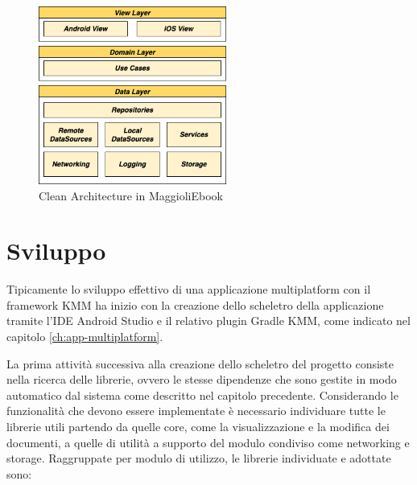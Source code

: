 \begin{figure}[H]
    \centering
    \includegraphics[width=0.55\textwidth]{img/clean-architecture.png}
    \caption{Clean Architecture in MaggioliEbook}
    \label{clean-arch-kmm-fig}
\end{figure}

\section{Sviluppo}
Tipicamente lo sviluppo effettivo di una applicazione multiplatform con il framework KMM ha inizio con la creazione dello scheletro della applicazione tramite l'IDE Android Studio e il relativo plugin Gradle KMM, come indicato nel capitolo \ref{ch:app-multiplatform}.

La prima attività successiva alla creazione dello scheletro del progetto consiste nella ricerca delle librerie, ovvero le stesse dipendenze che sono gestite in modo automatico dal sistema come descritto nel capitolo precedente. Considerando le funzionalità che devono essere implementate è necessario individuare tutte le librerie utili partendo da quelle core, come la visualizzazione e la modifica dei documenti, a quelle di utilità a supporto del modulo condiviso come networking e storage. Raggruppate per modulo di utilizzo, le librerie individuate e adottate sono:

